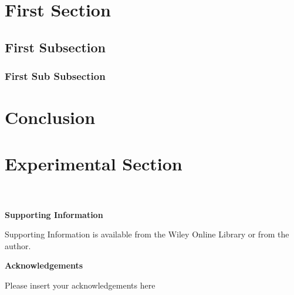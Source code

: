 \documentclass{WileyMSP-template}
\begin{document}
\section{First Section}


\subsection{First Subsection}


\subsubsection{First Sub Subsection}




\section{Conclusion}


\section{Experimental Section}
\\
\\



\medskip
\textbf{Supporting Information} \par %
Supporting Information is available from the Wiley Online Library or from the author.



\medskip
\textbf{Acknowledgements} \par %
Please insert your acknowledgements here

\medskip

%
%
%
\end{document}

